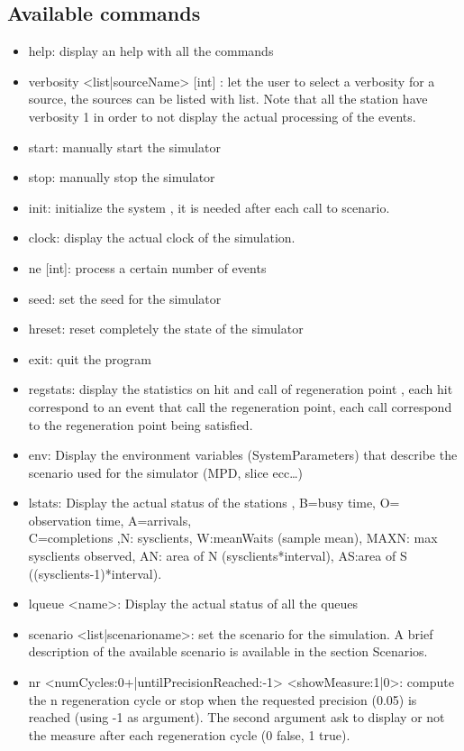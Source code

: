 \documentclass[12pt,a4paper]{article}
\begin{document}
\subsection{Available commands}
\begin{itemize}
    \item help: display an help with all the commands
    \item verbosity <list|sourceName> [int] : let the user to select a verbosity for a source, the sources can be listed with list. Note that all the station have verbosity 1 in order to not display the actual processing of the events.
    \item start: manually start the simulator
    \item stop: manually stop the simulator
    \item init: initialize the system , it is needed after each call to scenario.
    \item clock: display the actual clock of the simulation.
    \item ne [int]: process a certain number of events
    \item seed: set the seed for the simulator
    \item hreset: reset completely the state of the simulator
    \item exit: quit the program
    \item regstats: display the statistics on hit and call of regeneration point , each hit correspond to an event that call the regeneration point, each call correspond to the regeneration point being satisfied.
    \item env: Display the environment variables (SystemParameters) that describe the scenario used for the simulator (MPD, slice ecc\dots)
    \item lstats: Display the actual status of the stations , B=busy time, O= observation time, A=arrivals,\\C=completions ,N: sysclients, W:meanWaits (sample mean), MAXN: max sysclients observed, AN: area of N (sysclients*interval), AS:area of S ((sysclients-1)*interval).
    \item lqueue <name>: Display the actual status of all the queues
    \item scenario <list|scenarioname>: set the scenario for the simulation. A brief description of the available scenario is available in the section Scenarios.
    \item nr <numCycles:0+|untilPrecisionReached:-1> <showMeasure:1|0>: compute the n regeneration cycle or stop when the requested precision (0.05) is reached (using -1 as argument). The second argument ask to display or not the measure after each regeneration cycle (0 false, 1 true).

\end{itemize}
\end{document}
